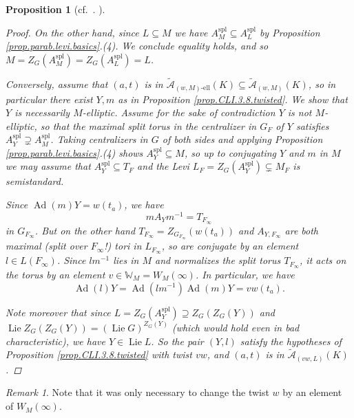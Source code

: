 \documentclass[openany]{amsbook}
\newtheorem{proposition}[theorem]{Proposition}
\theoremstyle{definition}
\theoremstyle{remark}
\newtheorem{remark}[theorem]{Remark}
\numberwithin{equation}{section}
\newcommand{\cA}{\mathcal{A}}
\renewcommand{\-}{\operatorname{-}}
\newcommand{\on}[1]{\operatorname{#1}}
\newcommand{\el}{\text{-ell}}
\newcommand{\ctA}{\widetilde{\cA}}
\newcommand{\ctAt}[2]{\ctA_{(#1,#2)}}
\newcommand{\ctAe}[2]{\ctA_{(#1, #2)\el}}
\newcommand{\Lie}{\on{Lie}}
\newcommand{\spl}{\mathrm{spl}}
\begin{document}
\begin{proposition}[{{{cf.\ \cite[Corollaire 3.9.2]{CLI}. }}}]
\begin{proof}
        On the other hand, since $L \subseteq M$ we have $A_M^{\spl} \subseteq A_L^{\spl}$ by Proposition \ref{prop.parab.levi.basics}.(4). We conclude equality holds, and so $M = Z_G(A_M^{\spl}) = Z_G(A_L^{\spl}) = L$. 

        Conversely, assume that $(a,t)$ is in $\ctAe{w}{M}(K) \subseteq \ctAt{w}{M}(K)$, so in particular there exist $Y,m$ as in Proposition \ref{prop.CLI.3.8.twisted}. We show that $Y$ is necessarily $M$-elliptic. Assume for the sake of contradiction $Y$ is not $M$-elliptic, so that the maximal split torus in the centralizer in $G_F$ of $Y$ satisfies $A_Y^{\spl} \supsetneq A_M^{\spl}$. Taking centralizers in $G$ of both sides and applying Proposition \ref{prop.parab.levi.basics}.(4) shows $A_Y^{\spl} \subseteq M$, so up to conjugating $Y$ and $m$ in $M$ we may assume that $A_Y^{\spl} \subseteq T_F$ and the Levi $L_F = Z_G(A_Y^{\spl}) \subsetneq M_F$ is semistandard. 

        Since $\on{Ad}(m) Y = w(t_a)$, we have
        \[
            m A_Y m^{-1} = T_{F_\infty}
        \]
        in $G_{F_{\infty}}$. But on the other hand $T_{F_\infty} = Z_{G_{F_\infty}}(w(t_a))$ and $A_{Y, F_\infty}$ are both maximal (split over $F_\infty$!) tori in $L_{F_\infty}$, so are conjugate by an element $l \in L(F_\infty)$. Since $l m^{-1}$ lies in $M$ and normalizes the split torus $T_{F_\infty}$, it acts on the torus by an element $v \in \mathbb{W}_M = W_M(\infty)$. In particular, we have
        \[
            \on{Ad}(l)Y = \on{Ad}(lm^{-1}) \on{Ad}(m) Y = v w(t_a).
        \]

        Note moreover that since $L = Z_G(A_Y^{\spl}) \supseteq Z_G(Z_G(Y))$ and $\Lie Z_G(Z_G(Y)) = (\Lie G)^{Z_G(Y)}$ (which would hold even in bad characteristic), we have $Y \in \Lie L$. So the pair $(Y, l)$ satisfy the hypotheses of Proposition \ref{prop.CLI.3.8.twisted} with twist $vw$, and $(a,t)$ is in $\ctAt{vw}{L}(K)$.
    \end{proof}
\end{proposition}
\begin{remark}
    Note that it was only necessary to change the twist $w$ by an element of $W_M(\infty)$. 
\end{remark}
\end{document}
